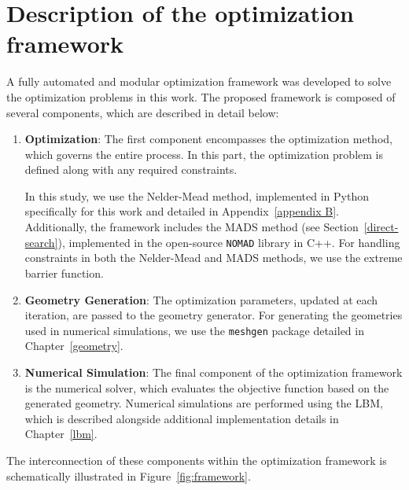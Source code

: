 \section{Description of the optimization framework}\label{framework}
A fully automated and modular optimization framework was developed to solve the optimization problems in this work. The proposed framework is composed of several components, which are described in detail below:

\begin{enumerate}
	\item \textbf{Optimization}:  
	The first component encompasses the optimization method, which governs the entire process. In this part, the optimization problem is defined along with any required constraints.
	
	In this study, we use the Nelder-Mead method, implemented in Python specifically for this work and detailed in Appendix~\ref{appendix B}. Additionally, the framework includes the MADS method (see Section~\ref{direct-search}), implemented in the open-source \texttt{NOMAD} library \cite{nomad} in C++. For handling constraints in both the Nelder-Mead and MADS methods, we use the extreme barrier function.
	
	\item \textbf{Geometry Generation}:  
	The optimization parameters, updated at each iteration, are passed to the geometry generator. For generating the geometries used in numerical simulations, we use the \texttt{meshgen} package detailed in Chapter~\ref{geometry}.
	
	\item \textbf{Numerical Simulation}:  
	The final component of the optimization framework is the numerical solver, which evaluates the objective function based on the generated geometry. Numerical simulations are performed using the LBM, which is described alongside additional implementation details in Chapter~\ref{lbm}.
\end{enumerate}

The interconnection of these components within the optimization framework is schematically illustrated in Figure~\ref{fig:framework}.


